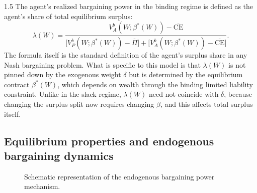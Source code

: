 \documentclass[12pt]{article}
\theoremstyle{definition}
\theoremstyle{plain}
\begin{document}
\begin{spacing}{1.5}
The agent's realized bargaining power in the binding regime is defined as the agent's share of total equilibrium surplus:
\[
\lambda(W)=\frac{V_A^{b}(W;\beta^*(W))-\overline{\text{CE}}}{\big[V_P^{b}(W;\beta^*(W))-\overline{\Pi}\big]+\big[V_A^{b}(W;\beta^*(W))-\overline{\text{CE}}\big]}.
\]
The formula itself is the standard definition of the agent's surplus share in any Nash bargaining problem. What is specific to this model is that $\lambda(W)$ is not pinned down by the exogenous weight $\delta$ but is determined by the equilibrium contract $\beta^*(W)$, which depends on wealth through the binding limited liability constraint.
Unlike in the slack regime, $\lambda(W)$ need not coincide with $\delta$, because changing the surplus split now requires changing $\beta$, and this affects total surplus itself.

\subsection{Equilibrium properties and endogenous bargaining dynamics}\label{subsec:equilibrium}

\begin{figure}[htbp]
\centering
\caption{Schematic representation of the endogenous bargaining power mechanism.}
\end{figure}
\end{spacing}
\end{document}
